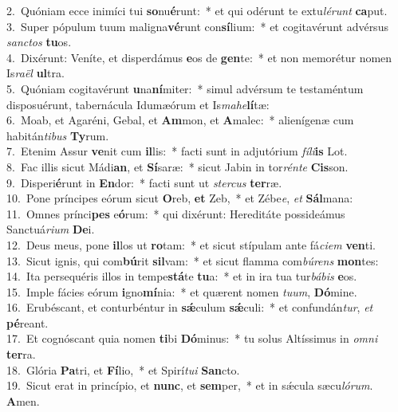 {2.~}Quóniam ecce inimíci tui \textbf{so}nu\textbf{é}runt:~* et qui odérunt te extu\textit{lé}\textit{runt} \textbf{ca}put.\\
{3.~}Super pópulum tuum maligna\textbf{vé}runt con\textbf{sí}lium:~* et cogitavérunt advérsus \textit{san}\textit{ctos} \textbf{tu}os.\\
{4.~}Dixérunt: Veníte, et disperdámus \textbf{e}os de \textbf{gen}te:~* et non memorétur nomen Is\textit{ra}\textit{ël} \textbf{ul}tra.\\
{5.~}Quóniam cogitavérunt \textbf{u}na\textbf{ní}miter:~* simul advérsum te testaméntum disposuérunt, tabernácula Idumæórum et Is\textit{ma}\textit{he}\textbf{lí}tæ:\\
{6.~}Moab, et Agaréni, Gebal, et \textbf{Am}mon, et \textbf{A}malec:~* alienígenæ cum habitán\textit{ti}\textit{bus} \textbf{Ty}rum.\\
{7.~}Etenim Assur \textbf{ve}nit cum \textbf{il}lis:~* facti sunt in adjutórium \textit{fí}\textit{li}\textbf{is} Lot.\\
{8.~}Fac illis sicut Mádi\textbf{an}, et \textbf{Sí}saræ:~* sicut Jabin in tor\textit{rén}\textit{te} \textbf{Cis}son.\\
{9.~}Disperi\textbf{é}runt in \textbf{En}dor:~* facti sunt ut \textit{ster}\textit{cus} \textbf{ter}ræ.\\
{10.~}Pone príncipes eórum sicut \textbf{O}reb, \textbf{et} Zeb,~* et Zébe\textit{e}, \textit{et} \textbf{Sál}mana:\\
{11.~}Omnes prínci\textbf{pes} e\textbf{ó}rum:~* qui dixérunt: Hereditáte possideámus Sanctuá\textit{ri}\textit{um} \textbf{De}i.\\
{12.~}Deus meus, pone \textbf{il}los ut \textbf{ro}tam:~* et sicut stípulam ante fá\textit{ci}\textit{em} \textbf{ven}ti.\\
{13.~}Sicut ignis, qui com\textbf{bú}rit \textbf{sil}vam:~* et sicut flamma com\textit{bú}\textit{rens} \textbf{mon}tes:\\
{14.~}Ita persequéris illos in tempe\textbf{stá}te \textbf{tu}a:~* et in ira tua tur\textit{bá}\textit{bis} \textbf{e}os.\\
{15.~}Imple fácies eórum \textbf{i}gno\textbf{mí}nia:~* et quærent nomen \textit{tu}\textit{um}, \textbf{Dó}mine.\\
{16.~}Erubéscant, et conturbéntur in \textbf{sǽ}culum \textbf{sǽ}culi:~* et confundán\textit{tur}, \textit{et} \textbf{pé}reant.\\
{17.~}Et cognóscant quia nomen \textbf{ti}bi \textbf{Dó}minus:~* tu solus Altíssimus in \textit{om}\textit{ni} \textbf{ter}ra.\\
{18.~}Glória \textbf{Pa}tri, et \textbf{Fí}lio,~* et Spirí\textit{tu}\textit{i} \textbf{San}cto.\\
{19.~}Sicut erat in princípio, et \textbf{nunc}, et \textbf{sem}per,~* et in sǽcula sæcu\textit{ló}\textit{rum}. \textbf{A}men.\\
